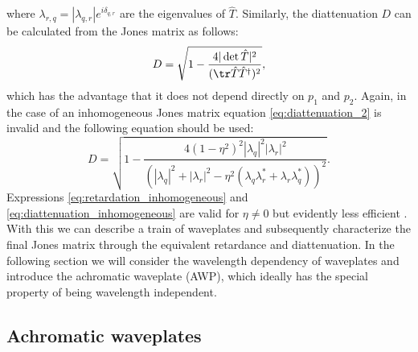 where $\lambda_{r,q}=|\lambda_{q,r}|e^{i\delta_{q,r}}$ are the eigenvalues of $\hat{T}$.
Similarly, the diattenuation $D$ can be calculated from the Jones matrix as follows:
\begin{equation}
    \label{eq:diattenuation_2}
    D=\sqrt{1-\frac{4|\det \hat{T}|^2}{(\tr \hat{T}\hat{T}^{\dagger})^2}},
\end{equation}
which has the advantage that it does not depend directly on $p_1$ and $p_2$. Again, in the case of an inhomogeneous Jones matrix equation \ref{eq:diattenuation_2} is invalid and the following equation should be used:
\begin{equation}
    \label{eq:diattenuation_inhomogeneous}
    D=\sqrt{1- \frac{4(1-\eta^2)^2|\lambda_q|^2|\lambda_r|^2}
    {\left(|\lambda_q|^2+|\lambda_r|^2-\eta^2(\lambda_q\lambda_r^*+\lambda_r\lambda_q^*)\right)^2}}.
\end{equation}
Expressions \ref{eq:retardation_inhomogeneous} and \ref{eq:diattenuation_inhomogeneous} are valid for $\eta \neq 0$ but evidently less efficient \cite{Lu1994}. With this we can describe a train of waveplates and subsequently characterize the final Jones matrix through the equivalent retardance and diattenuation. In the following section we will consider the wavelength dependency of waveplates and introduce the achromatic waveplate (AWP), which ideally has the special property of being wavelength independent. 

\subsection{Achromatic waveplates}
\label{sec:achromatic_waveplates}

